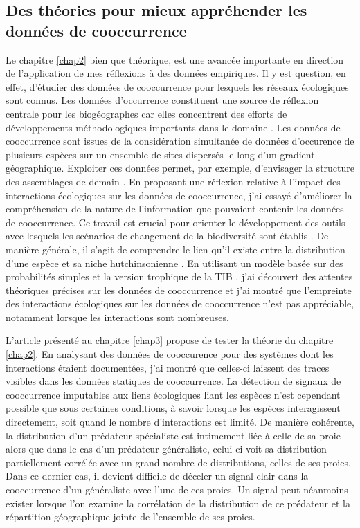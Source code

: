 \subsection*{Des théories pour mieux appréhender les données de
cooccurrence}\label{des-thuxe9ories-pour-mieux-appruxe9hender-les-donnuxe9es-de-cooccurrence}

Le chapitre \ref{chap2} bien que théorique, est une avancée importante
en direction de l'application de mes réflexions à des données
empiriques. Il y est question, en effet, d'étudier des données de
cooccurrence pour lesquels les réseaux écologiques sont connus. Les
données d'occurrence constituent une source de réflexion centrale pour
les biogéographes car elles concentrent des efforts de développements
méthodologiques importants dans le domaine
\citep{Elith2006, Phillips2006, Pollock2014}. Les données de
cooccurrence sont issues de la considération simultanée de données
d'occurence de plusieurs espèces sur un ensemble de sites dispersés le
long d'un gradient géographique. Exploiter ces données permet, par
exemple, d'envisager la structure des assemblages de demain
\citep{Albouy2012}. En proposant une réflexion relative à l'impact des
interactions écologiques sur les données de cooccurrence, j'ai essayé
d'améliorer la compréhension de la nature de l'information que pouvaient
contenir les données de cooccurrence. Ce travail est crucial pour
orienter le développement des outils avec lesquels les scénarios de
changement de la biodiversité sont établis \citep{Godsoe2015}. De
manière générale, il s'agit de comprendre le lien qu'il existe entre la
distribution d'une espèce et sa niche hutchinsonienne
\citep{Pulliam2000, Godsoe2010a}. En utilisant un modèle basée sur des
probabilités simples et la version trophique de la TIB
\citep{Gravel2011}, j'ai découvert des attentes théoriques précises sur
les données de cooccurrence et j'ai montré que l'empreinte des
interactions écologiques sur les données de cooccurrence n'est pas
appréciable, notamment lorsque les interactions sont nombreuses.

L'article présenté au chapitre \ref{chap3} propose de tester la théorie
du chapitre \ref{chap2}. En analysant des données de cooccurence pour
des systèmes dont les interactions étaient documentées, j'ai montré que
celles-ci laissent des traces visibles dans les données statiques de
cooccurrence. La détection de signaux de cooccurrence imputables aux
liens écologiques liant les espèces n'est cependant possible que sous
certaines conditions, à savoir lorsque les espèces interagissent
directement, soit quand le nombre d'interactions est limité. De manière
cohérente, la distribution d'un prédateur spécialiste est intimement
liée à celle de sa proie alors que dans le cas d'un prédateur
généraliste, celui-ci voit sa distribution partiellement corrélée avec
un grand nombre de distributions, celles de ses proies. Dans ce dernier
cas, il devient difficile de déceler un signal clair dans la
cooccurrence d'un généraliste avec l'une de ces proies. Un signal peut
néanmoins exister lorsque l'on examine la corrélation de la distribution
de ce prédateur et la répartition géographique jointe de l'ensemble de
ses proies.

